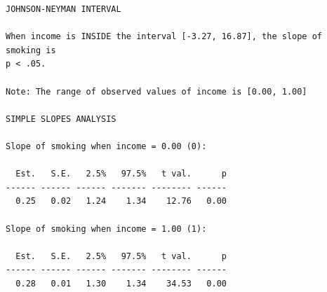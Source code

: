 \documentclass[
  letterpaper,
  DIV=11,
  numbers=noendperiod]{scrreprt}
\newenvironment{Shaded}{\begin{snugshade}}{\end{snugshade}}
\newcommand{\AttributeTok}[1]{\textcolor[rgb]{0.40,0.45,0.13}{#1}}
\newcommand{\CommentTok}[1]{\textcolor[rgb]{0.37,0.37,0.37}{#1}}
\newcommand{\ConstantTok}[1]{\textcolor[rgb]{0.56,0.35,0.01}{#1}}
\newcommand{\FunctionTok}[1]{\textcolor[rgb]{0.28,0.35,0.67}{#1}}
\newcommand{\NormalTok}[1]{\textcolor[rgb]{0.00,0.23,0.31}{#1}}
\newcommand{\OtherTok}[1]{\textcolor[rgb]{0.00,0.23,0.31}{#1}}
\newcommand{\SpecialCharTok}[1]{\textcolor[rgb]{0.37,0.37,0.37}{#1}}
\newcommand{\StringTok}[1]{\textcolor[rgb]{0.13,0.47,0.30}{#1}}
\begin{document}
\begin{Shaded}
\end{Shaded}

\begin{verbatim}
JOHNSON-NEYMAN INTERVAL 

When income is INSIDE the interval [-3.27, 16.87], the slope of smoking is
p < .05.

Note: The range of observed values of income is [0.00, 1.00]

SIMPLE SLOPES ANALYSIS 

Slope of smoking when income = 0.00 (0): 

  Est.   S.E.   2.5%   97.5%   t val.      p
------ ------ ------ ------- -------- ------
  0.25   0.02   1.24    1.34    12.76   0.00

Slope of smoking when income = 1.00 (1): 

  Est.   S.E.   2.5%   97.5%   t val.      p
------ ------ ------ ------- -------- ------
  0.28   0.01   1.30    1.34    34.53   0.00
\end{verbatim}
\end{document}
